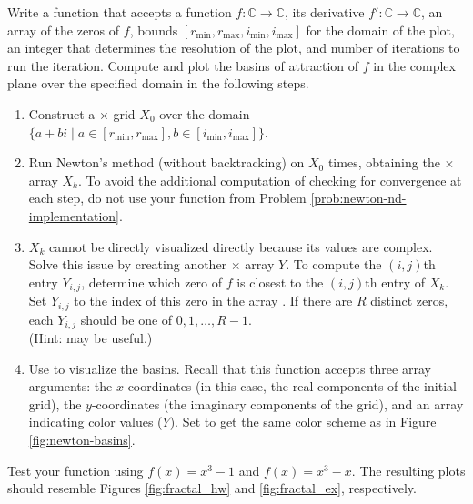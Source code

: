 \begin{problem} %
Write a function that accepts a function $f:\mathbb{C}\rightarrow\mathbb{C}$, its derivative $f':\mathbb{C}\rightarrow\mathbb{C}$, an array  of the zeros of $f$, bounds $[r_{\text{min}},r_{\text{max}},i_{\text{min}},i_{\text{max}}]$ for the domain of the plot, an integer  that determines the resolution of the plot, and number of iterations  to run the iteration.
Compute and plot the basins of attraction of $f$ in the complex plane over the specified domain in the following steps.
\begin{enumerate}
\item Construct a $\times$ grid $X_0$ over the domain $\{a+bi \mid a \in [r_{\text{min}},r_{\text{max}}], b \in [i_{\text{min}},i_{\text{max}}]\}$.

\item Run Newton's method (without backtracking) on $X_0$  times, obtaining the $\times$ array $X_{k}$.
To avoid the additional computation of checking for convergence at each step, do not use your function from Problem \ref{prob:newton-nd-implementation}.

\item $X_k$ cannot be directly visualized directly because its values are complex.
Solve this issue by creating another $\times$ array $Y$.
To compute the $(i,j)$th entry $Y_{i,j}$, determine which zero of $f$ is closest to the $(i,j)$th entry of $X_k$.
Set $Y_{i,j}$ to the index of this zero in the array .
If there are $R$ distinct zeros, each $Y_{i,j}$ should be one of $0,1,\ldots,R-1$.
\\(Hint:  may be useful.)

\item Use  to visualize the basins.
Recall that this function accepts three array arguments: the $x$-coordinates (in this case, the real components of the initial grid), the $y$-coordinates (the imaginary components of the grid), and an array indicating color values ($Y$).
Set  to get the same color scheme as in Figure \ref{fig:newton-basins}.
\end{enumerate}

Test your function using $f(x) = x^3-1$ and $f(x)=x^3-x$.
The resulting plots should resemble Figures \ref{fig:fractal_hw} and \ref{fig:fractal_ex}, respectively.
\end{problem}


